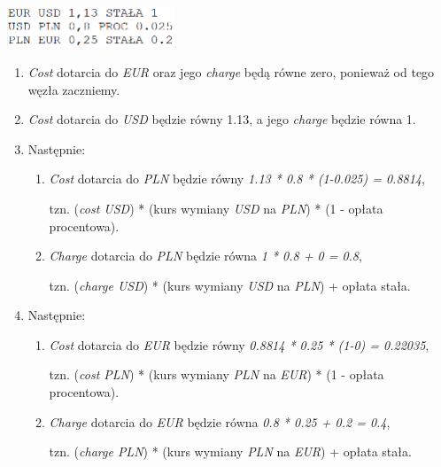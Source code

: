 \documentclass[a4paper,11pt]{article}
\begin{document}
\begin{center}
\includegraphics[width = 5cm]{Przyklad}
\end{center}

\begin{enumerate}
\item \textit{Cost} dotarcia do \textit{EUR} oraz jego \textit{charge} będą równe zero, ponieważ od tego węzła zaczniemy.
\item \textit{Cost} dotarcia do \textit{USD} będzie równy 1.13, a jego \textit{charge} będzie równa 1.
\item Następnie:
\begin{enumerate}
\item  \textit{Cost} dotarcia do \textit{PLN} będzie równy \textit{1.13 * 0.8 * (1-0.025) = 0.8814},

		tzn. (\textit{cost USD}) * (kurs wymiany \textit{USD} na \textit{PLN}) * (1 - opłata procentowa).
\item \textit{Charge} dotarcia do \textit{PLN} będzie równa \textit{1 * 0.8 + 0 = 0.8},

		tzn. (\textit{charge USD}) *  (kurs wymiany \textit{USD} na \textit{PLN}) + opłata stała.
\end{enumerate}
\item Następnie:
\begin{enumerate}
\item  \textit{Cost} dotarcia do \textit{EUR} będzie równy \textit{0.8814 * 0.25 * (1-0) = 0.22035},

		tzn. (\textit{cost PLN}) * (kurs wymiany \textit{PLN} na \textit{EUR}) * (1 - opłata procentowa).
\item \textit{Charge} dotarcia do \textit{EUR} będzie równa \textit{0.8 * 0.25 + 0.2 = 0.4},

		tzn. (\textit{charge PLN}) *  (kurs wymiany \textit{PLN} na \textit{EUR}) + opłata stała.
\end{enumerate}
\end{enumerate}
\end{document}
